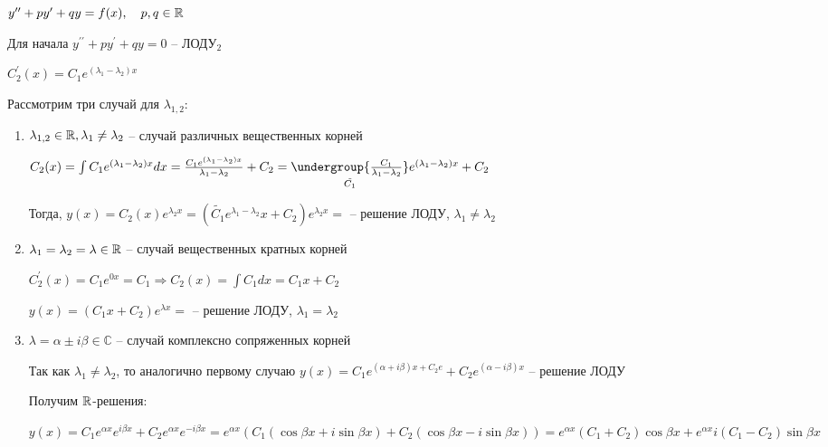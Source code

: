 \documentclass[12pt]{article}
\begin{document}
    \Mem $y^{\prime\prime} + py^\prime + qy = f(x), \quad p, q \in \mathbb{R}$

    Для начала $y^{\prime\prime} + py^\prime + qy = 0$ -- ЛОДУ$_2$

    $C^\prime_2 (x) = C_1 e^{(\lambda_1 - \lambda_2)x}$

    Рассмотрим три случай для $\lambda_{1,2}$:

    \hypertarget{ldesgdifferentrealsolutions}{}

    \begin{enumerate}
        \item $\lambda_{1,2} \in \mathbb{R}, \lambda_1 \neq \lambda_2$ -- случай различных вещественных корней

        $C_2(x) = \int C_1 e^{(\lambda_1 - \lambda_2)x} dx = \frac{C_1 e^{(\lambda_1 - \lambda_2)x}}{\lambda_1 - \lambda_2} + C_2 =
        \underset{\tilde{C_1}}{\undergroup{\frac{C_1}{\lambda_1 - \lambda_2}}} e^{(\lambda_1 - \lambda_2)x} + C_2$

        Тогда, $y(x) = C_2(x) e^{\lambda_2 x} = (\tilde{C_1}e^{\lambda_1 - \lambda_2}x + C_2)e^{\lambda_2 x} = $ -- решение ЛОДУ, $\lambda_1 \neq \lambda_2$

        \hypertarget{ldesgequalrealsolutions}{}

        \item $\lambda_1 = \lambda_2 = \lambda \in \mathbb{R}$ -- случай вещественных кратных корней

        $C_2^\prime (x) = C_1 e^{0x} = C_1 \Longrightarrow C_2(x) = \int C_1 dx = C_1 x + C_2$

        $y(x) = (C_1 x + C_2)e^{\lambda x} = $ -- решение ЛОДУ, $\lambda_1 = \lambda_2$

        \hypertarget{ldesgcomplexsolutions}{}

        \item $\lambda = \alpha \pm i \beta \in \mathbb{C}$ -- случай комплексно сопряженных корней

        Так как $\lambda_1 \neq \lambda_2$, то аналогично первому случаю $y(x) = C_1 e^{(\alpha + i \beta)x + C_2 e} + C_2 e^{(\alpha - i \beta) x}$ -- решение ЛОДУ

        Получим $\mathbb{R}$-решения:

        $y(x) = C_1 e^{\alpha x} e^{i\beta x} + C_2 e^{\alpha x} e^{-i\beta x} = e^{\alpha x} (C_1 (\cos\beta x + i\sin\beta x) + C_2 (\cos\beta x - i\sin \beta x)) =
        e^{\alpha x} (C_1 + C_2) \cos\beta x + e^{\alpha x} i (C_1 - C_2) \sin\beta x$


\end{enumerate}
\end{document}
